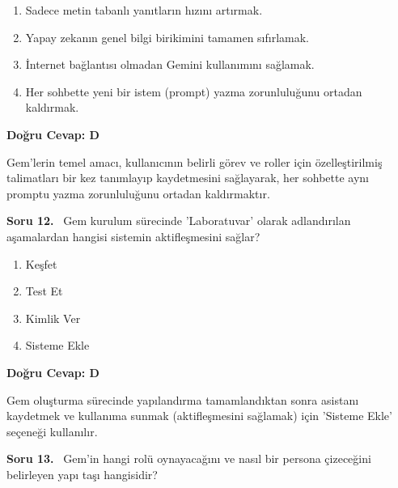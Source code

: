 \documentclass[11pt,a4paper,openany]{book}
\begin{document}
\begin{enumerate}[label=\Alph*), leftmargin=25pt, topsep=4pt, itemsep=2pt]
        \item Sadece metin tabanlı yanıtların hızını artırmak.
        \item Yapay zekanın genel bilgi birikimini tamamen sıfırlamak.
        \item İnternet bağlantısı olmadan Gemini kullanımını sağlamak.
        \item Her sohbette yeni bir istem (prompt) yazma zorunluluğunu ortadan kaldırmak.
\end{enumerate}

\vspace{4pt}
\begin{tcolorbox}[title=Cevap ve Açıklama, colback=gray!3!white, colframe=primarycolor!90!black, arc=2mm, fonttitle=\bfseries\sffamily, top=6pt, bottom=6pt]
    \textbf{Doğru Cevap: D}

    \vspace{2pt}
    Gem'lerin temel amacı, kullanıcının belirli görev ve roller için özelleştirilmiş talimatları bir kez tanımlayıp kaydetmesini sağlayarak, her sohbette aynı promptu yazma zorunluluğunu ortadan kaldırmaktır.
\end{tcolorbox}
\vspace{10pt}
\needspace{5cm}
\vspace{8pt}
\noindent\textbf{\large\sffamily Soru 12.} \ Gem kurulum sürecinde 'Laboratuvar' olarak adlandırılan aşamalardan hangisi sistemin aktifleşmesini sağlar?

\begin{enumerate}[label=\Alph*), leftmargin=25pt, topsep=4pt, itemsep=2pt]
        \item Keşfet
        \item Test Et
        \item Kimlik Ver
        \item Sisteme Ekle
\end{enumerate}

\vspace{4pt}
\begin{tcolorbox}[title=Cevap ve Açıklama, colback=gray!3!white, colframe=primarycolor!90!black, arc=2mm, fonttitle=\bfseries\sffamily, top=6pt, bottom=6pt]
    \textbf{Doğru Cevap: D}

    \vspace{2pt}
    Gem oluşturma sürecinde yapılandırma tamamlandıktan sonra asistanı kaydetmek ve kullanıma sunmak (aktifleşmesini sağlamak) için 'Sisteme Ekle' seçeneği kullanılır.
\end{tcolorbox}
\vspace{10pt}
\needspace{5cm}
\vspace{8pt}
\noindent\textbf{\large\sffamily Soru 13.} \ Gem'in hangi rolü oynayacağını ve nasıl bir persona çizeceğini belirleyen yapı taşı hangisidir?
\end{document}
